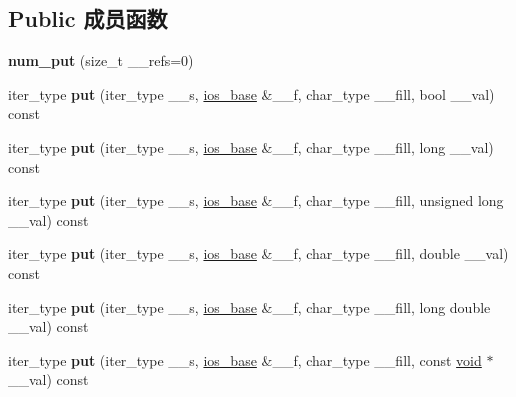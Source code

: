 \subsection*{Public 成员函数}
\begin{DoxyCompactItemize}
\item 
\mbox{\label{classnum__put_a4df74132c4cd5538d4d66044824a208d}} 
{\bfseries num\+\_\+put} (size\+\_\+t \+\_\+\+\_\+refs=0)
\item 
\mbox{\label{classnum__put_afec362679d17f992ef5239f00d09fa5a}} 
iter\+\_\+type {\bfseries put} (iter\+\_\+type \+\_\+\+\_\+s, \hyperlink{classios__base}{ios\+\_\+base} \&\+\_\+\+\_\+f, char\+\_\+type \+\_\+\+\_\+fill, bool \+\_\+\+\_\+val) const
\item 
\mbox{\label{classnum__put_aaec1cbe25001740084eab7879df5db45}} 
iter\+\_\+type {\bfseries put} (iter\+\_\+type \+\_\+\+\_\+s, \hyperlink{classios__base}{ios\+\_\+base} \&\+\_\+\+\_\+f, char\+\_\+type \+\_\+\+\_\+fill, long \+\_\+\+\_\+val) const
\item 
\mbox{\label{classnum__put_a7cba6e27c752d13e6fe22fcd8b0c5b46}} 
iter\+\_\+type {\bfseries put} (iter\+\_\+type \+\_\+\+\_\+s, \hyperlink{classios__base}{ios\+\_\+base} \&\+\_\+\+\_\+f, char\+\_\+type \+\_\+\+\_\+fill, unsigned long \+\_\+\+\_\+val) const
\item 
\mbox{\label{classnum__put_abea5b8ef8092419b7f9897dc5fe58700}} 
iter\+\_\+type {\bfseries put} (iter\+\_\+type \+\_\+\+\_\+s, \hyperlink{classios__base}{ios\+\_\+base} \&\+\_\+\+\_\+f, char\+\_\+type \+\_\+\+\_\+fill, double \+\_\+\+\_\+val) const
\item 
\mbox{\label{classnum__put_a4afdb78ac70ed46ff48e4a6c36080a69}} 
iter\+\_\+type {\bfseries put} (iter\+\_\+type \+\_\+\+\_\+s, \hyperlink{classios__base}{ios\+\_\+base} \&\+\_\+\+\_\+f, char\+\_\+type \+\_\+\+\_\+fill, long double \+\_\+\+\_\+val) const
\item 
\mbox{\label{classnum__put_a04a270162ac7f92fdfb1c9b4d153199f}} 
iter\+\_\+type {\bfseries put} (iter\+\_\+type \+\_\+\+\_\+s, \hyperlink{classios__base}{ios\+\_\+base} \&\+\_\+\+\_\+f, char\+\_\+type \+\_\+\+\_\+fill, const \hyperlink{interfacevoid}{void} $\ast$\+\_\+\+\_\+val) const
\end{DoxyCompactItemize}
